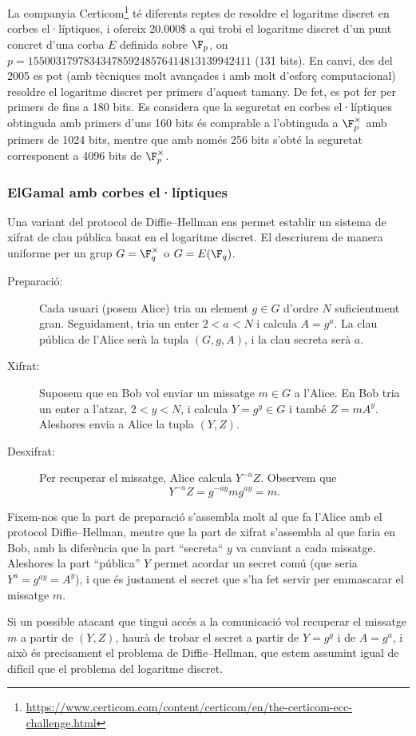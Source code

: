La companyia Certicom\footnote{\url{https://www.certicom.com/content/certicom/en/the-certicom-ecc-challenge.html}} té diferents reptes de resoldre el logaritme discret en corbes el·líptiques, i ofereix 20.000\$ a qui trobi el logaritme discret d'un punt concret d'una corba $E$ definida sobre $\F_p$, on $p=1550031797834347859248576414813139942411$ (131 bits). En canvi, des del 2005 es pot (amb tècniques molt avançades i amb molt d'esforç computacional) resoldre el logaritme discret per primers d'aquest tamany. De fet, es pot fer per primers de fins a 180 bits. Es considera que la seguretat en corbes el·líptiques obtinguda amb primers d'uns 160 bits és comprable a l'obtinguda a $\F_p^\times$ amb primers de 1024 bits, mentre que amb només 256 bits s'obté la seguretat corresponent a 4096 bits de $\F_p^\times$.

 \subsubsection{ElGamal amb corbes el·líptiques}
 Una variant del protocol de Diffie--Hellman ens permet establir un sistema de xifrat de clau pública basat en el logaritme discret. El descriurem de manera uniforme per  un grup $G=\F_q^\times$ o $G=E(\F_q)$.
 
 \begin{description}
 \item[Preparació: ] Cada usuari (posem Alice) tria un element $g\in G$ d'ordre $N$ suficientment gran. Seguidament, tria un enter $2< a < N$ i calcula $A=g^a$. La clau pública de l'Alice serà la tupla $(G,g,A)$, i la clau secreta serà $a$.
 \item[Xifrat: ] Suposem que en Bob vol enviar un missatge $m\in G$ a l'Alice. En Bob tria un enter a l'atzar, $2< y < N$, i calcula $Y=g^y\in G$ i també $Z=mA^y$. Aleshores envia a Alice la tupla $(Y,Z)$.
 \item[Desxifrat: ] Per recuperar el missatge, Alice calcula $Y^{-a} Z$. Observem que
 \[
 Y^{-a}Z = g^{-ay}mg^{ay} = m.
 \]
 \end{description}
 Fixem-nos que la part de preparació s'assembla molt al que fa l'Alice amb el protocol Diffie--Hellman, mentre que la part de xifrat s'assembla al que faria en Bob, amb la diferència que la part ``secreta`` $y$ va canviant a cada missatge. Aleshores la part ``pública'' $Y$ permet acordar un secret comú (que seria $Y^a=g^{ay}=A^y$), i que és justament el secret que s'ha fet servir per emmascarar el missatge $m$.
 
 Si un possible atacant que tingui accés a la comunicació vol recuperar el missatge $m$ a partir de $(Y,Z)$, haurà de trobar el secret a partir de $Y=g^y$ i de $A=g^a$, i això és precisament el problema de Diffie--Hellman, que estem assumint igual de difícil que el problema del logaritme discret.
 
